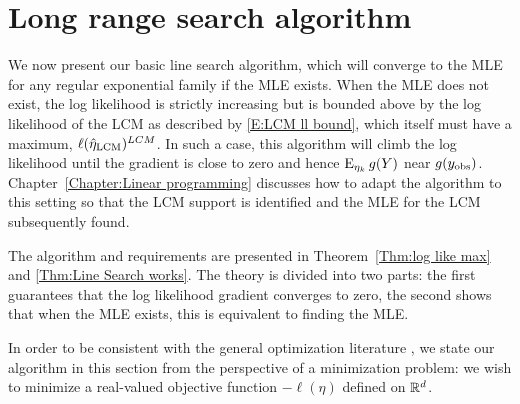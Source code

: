 \section{Long range search algorithm} \label{S:Algorithm}
We now present our basic line search algorithm, which will converge to the MLE for any 
regular exponential family if the MLE exists.  When the MLE does not exist, the log
likelihood is strictly increasing but is bounded above by the log likelihood of the LCM
as described by \eqref{E:LCM ll bound}, which itself must have a maximum, $\ell(\hat{\eta}_{\textrm{LCM}})^{LCM}$.
In such a case, this algorithm will climb the log likelihood until the gradient is 
close to zero and hence $\operatorname{E}_{\eta_k}g(Y)$ near $g(y_{\text{obs}})$.  
Chapter~\ref{Chapter:Linear programming} discusses how to adapt the algorithm to this setting
so that the LCM support is identified and the MLE for the LCM subsequently found. 

The algorithm and requirements are presented in Theorem~\ref{Thm:log like max} and \ref{Thm:Line Search works}.  The theory is divided into two parts: the first
guarantees that the log likelihood gradient converges to zero, the second shows that when the MLE exists, this is equivalent to finding the MLE.  

In order to be consistent with the general optimization literature \citep{Fletcher,NW}, 
we state our algorithm in this 
section from the perspective of a minimization problem: we wish to minimize a 
real-valued objective function $-\ell(\eta)$ 
defined on ${\mathbb R}^d$.  

